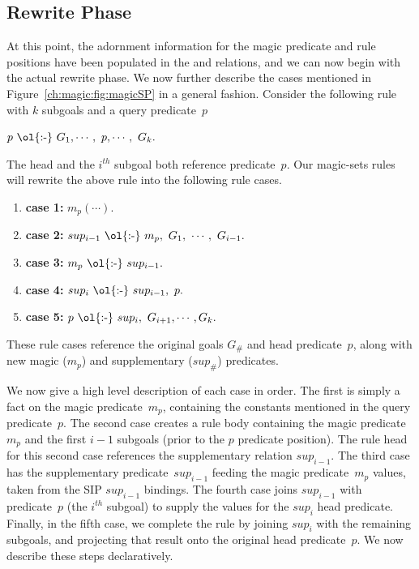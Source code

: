 \subsection{Rewrite Phase}
\label{ch:magic:sec:rewrite}
 
At this point, the adornment information for the magic predicate and rule positions
have been populated in the  and  relations, and we can now
begin with the actual rewrite phase.  We now further describe the cases mentioned
in Figure~\ref{ch:magic:fig:magicSP} in a general fashion. Consider the following rule with
$k$ subgoals and a query predicate~$p$ 
\begin{trivlist}
\ssp
\item $p\ \text{\ol{:-}}\ G_1, \cdots,\ p, \cdots,\ G_k.$
\end{trivlist}
The head and the $i^{th}$ subgoal both reference predicate~$p$.  Our magic-sets
rules will rewrite the above rule into the following rule cases.
\begin{enumerate}
\ssp
\item {\bf case 1:} $m_p(\cdots).$ 
\item {\bf case 2:} $sup_{i-1}\ \text{\ol{:-}}\ m_p,\ G_1,\ \cdots,\ G_{i-1}.$ 
\item {\bf case 3:} $m_p\ \text{\ol{:-}}\ sup_{i-1}.$ 
\item {\bf case 4:} $sup_i\ \text{\ol{:-}}\ sup_{i-1},\ p.$ 
\item {\bf case 5:} $p\ \text{\ol{:-}}\ sup_i,\ G_{i+1}, \cdots, G_k.$ 
\end{enumerate}
These rule cases reference the original goals $G_{\#}$ and head predicate~$p$,
along with new magic ($m_p$) and supplementary ($sup_{\#}$) predicates.  


We now give a high level description of each case in order.  The first is
simply a fact on the magic predicate~$m_p$, containing the constants mentioned
in the query predicate~$p$.  The second case creates a rule body containing the
magic predicate~$m_p$ and the first $i-1$ subgoals (prior to the $p$ predicate
position).  The rule head for this second case references the supplementary
relation $sup_{i-1}$.  The third case has the supplementary
predicate~$sup_{i-1}$ feeding the magic predicate~$m_p$ values, taken from the
SIP $sup_{i-1}$ bindings.  The fourth case joins $sup_{i-1}$ with predicate~$p$
(the $i^{th}$ subgoal) to supply the values for the $sup_i$ head predicate.
Finally, in the fifth case, we complete the rule by joining $sup_i$ with the
remaining subgoals, and projecting that result onto the original head
predicate~$p$.  We now describe these steps declaratively.

